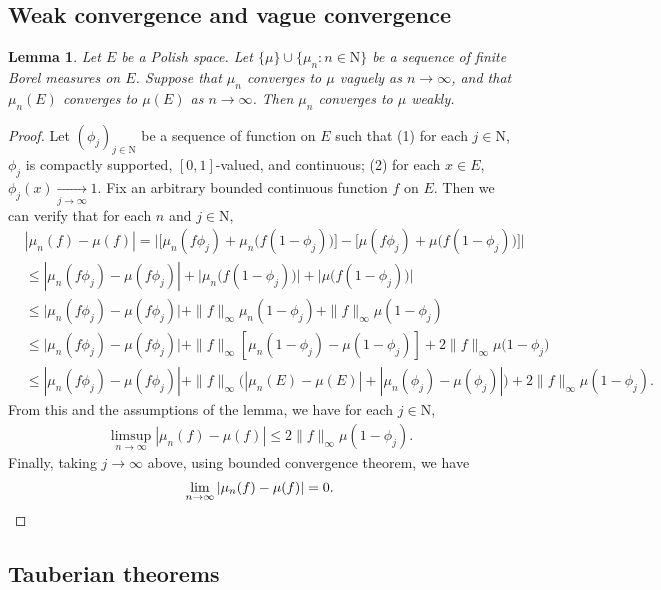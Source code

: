 \documentclass[12pt,a4paper]{amsart}
\numberwithin{equation}{section}
\theoremstyle{plain}
\newtheorem{lem}[thm]{Lemma}
\theoremstyle{definition}
\theoremstyle{remark}
\begin{document}
\subsection{Weak convergence and vague convergence}
\begin{lem} \label{thm:A.1}
	Let $E$ be a Polish space.
	Let $\{\mu\}\cup\{\mu_n:n\in \mathrm N\}$ be a sequence of finite Borel measures on $E$.
	Suppose that $\mu_n$ converges to $\mu$ vaguely as $n\to \infty$, and that $\mu_n(E)$ converges to $\mu(E)$ as $n\to \infty$.
	Then $\mu_n$ converges to $\mu$ weakly.
\end{lem}
\begin{proof}
	Let $(\phi_j)_{j\in \mathrm N}$ be a sequence of function on $E$ such that
	(1) for each $j\in \mathrm N$, $\phi_j$ is compactly supported, $[0,1]$-valued, and continuous;
	(2) for each $x\in E$, $\phi_j(x)\xrightarrow[j\to \infty]{} 1$.
	Fix an arbitrary bounded continuous function $f$ on $E$.
	Then we can verify that for each $n$ and $j\in \mathrm N$,
 \begin{align}
 	&  |\mu_n(f) -\mu(f)|
 	= \big|\big[\mu_n(f\phi_j) + \mu_n\big(f(1-\phi_j)\big) \big]- \big[\mu(f\phi_j) + \mu\big(f(1-\phi_j)\big)\big]\big|
 	\\&\leq|\mu_n(f\phi_j) - \mu(f\phi_j)| + \big|\mu_n\big(f(1-\phi_j)\big)\big| + \big|\mu\big(f(1-\phi_j)\big)\big|
 	\\&\leq \big|\mu_n(f\phi_j) - \mu(f\phi_j)\big| + \|f\|_\infty \mu_n(1-\phi_j) + \|f\|_\infty\mu(1-\phi_j)
 	\\&\leq \big|\mu_n(f\phi_j) - \mu(f\phi_j)\big| + \|f\|_\infty [\mu_n(1-\phi_j)-\mu(1-\phi_j)] + 2\|f\|_\infty\mu\big(1-\phi_j\big)
 	\\&\leq |\mu_n(f\phi_j)-\mu(f\phi_j)| + \|f\|_\infty \big(|\mu_n(E)- \mu(E)| + |\mu_n(\phi_j)-\mu(\phi_j)|\big) + 2\|f\|_\infty \mu(1-\phi_j).
 \end{align}
 From this and the assumptions of the lemma, we have for each $j\in \mathrm N$,
 \begin{align}
 	\limsup_{n\to \infty} |\mu_n(f) - \mu(f)| \leq 2\|f\|_\infty \mu(1-\phi_j).
 \end{align}
 Finally, taking $j \to \infty$ above, using bounded convergence theorem, we have
 \[
 \lim_{n\to \infty} |\mu_n(f)-\mu(f)| = 0. \qedhere
 \]
\end{proof}

\subsection{Tauberian theorems}
\end{document}

